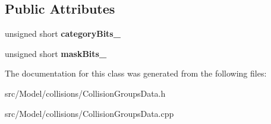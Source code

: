 \subsection*{Public Attributes}
\begin{DoxyCompactItemize}
\item 
unsigned short {\bfseries category\+Bits\+\_\+}\hypertarget{classCollisionGroupsData_a2943a728bc5a2c3e054173ebc94e2e2a}{}\label{classCollisionGroupsData_a2943a728bc5a2c3e054173ebc94e2e2a}

\item 
unsigned short {\bfseries mask\+Bits\+\_\+}\hypertarget{classCollisionGroupsData_a5f3d1acf7a7c1541429c55aeda69a132}{}\label{classCollisionGroupsData_a5f3d1acf7a7c1541429c55aeda69a132}

\end{DoxyCompactItemize}


The documentation for this class was generated from the following files\+:\begin{DoxyCompactItemize}
\item 
src/\+Model/collisions/Collision\+Groups\+Data.\+h\item 
src/\+Model/collisions/Collision\+Groups\+Data.\+cpp\end{DoxyCompactItemize}

